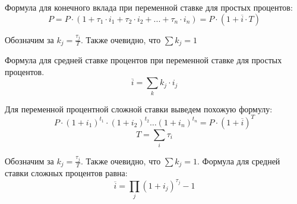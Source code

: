 \documentclass[aps,%
12pt,%
final,%
oneside,
onecolumn,%
musixtex, %
superscriptaddress,%
centertags]{article} %
\begin{document}
Формула для конечного вклада при переменной ставке для простых процентов:
$$ P = P \cdot (1+\tau_1 \cdot i_1 + \tau_2 \cdot i_2 + ... + \tau_n \cdot i_n) = P \cdot (1+ \overline{i}\cdot T) $$

Обозначим за $ k_j = \frac{\tau_j}{T}$. Также очевидно, что $\sum k_j = 1$

Формула для средней ставке процентов при переменной ставке для простых процентов.
$$ \overline{i} = \sum_{k}{k_j\cdot i_j} $$

Для переменной процентной сложной ставки выведем похожую формулу:
$$ P \cdot (1+i_1)^{t_1} \cdot (1+i_2)^{t_2} \ldots (1+i_n)^{t_n} =P \cdot  (1+\overline{i})^{T} $$
$$ T =  \sum_{i}{\tau_i} $$

Обозначим за $ k_j = \frac{\tau_j}{T}$. Также очевидно, что $\sum k_j = 1$.
Формула для средней ставки сложных процентов равна:
$$ \overline{i} = \prod_j (1+i_j)^{\tau_j}  - 1 $$
\end{document}
